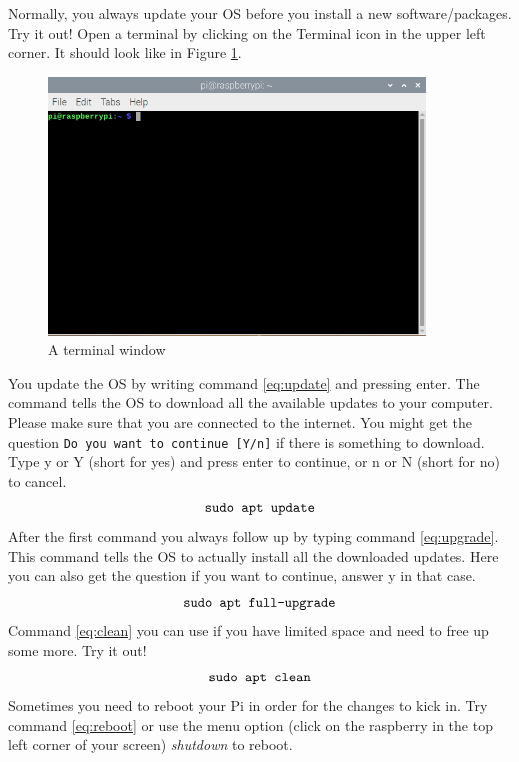 \documentclass{article}
\newcommand{\figref}[1]{Figure \ref{fig:#1}}
\begin{document}
Normally, you always update your OS before you install a new software/packages.\\
Try it out! Open a terminal by clicking on the Terminal icon in the upper left corner. It should look like in \figref{terminal}.
\begin{figure}[h]
    \centering
    \includegraphics[width=100mm]{terminal.png}
    \caption{A terminal window}
    \label{fig:terminal}
\end{figure}
\newline
You update the OS by writing command \eqref{eq:update} and pressing enter. The command tells the OS to download all the available updates to your computer. Please make sure that you are connected to the internet. You might get the question \texttt{Do you want to continue [Y/n]} if there is something to download. Type y or Y (short for yes) and press enter to continue, or n or N (short for no) to cancel.
\begin{equation}
\label{eq:update}
\verb!sudo apt update!
\end{equation}
After the first command you always follow up by typing command \eqref{eq:upgrade}. This command tells the OS to actually install all the downloaded updates. Here you can also get the question if you want to continue, answer y in that case. 
\begin{equation}
\label{eq:upgrade}
\verb!sudo apt full-upgrade!
\end{equation}
Command \eqref{eq:clean} you can use if you have limited space and need to free up some more. Try it out!
\begin{equation}
\label{eq:clean}
\verb!sudo apt clean!
\end{equation}
Sometimes you need to reboot your Pi in order for the changes to kick in. Try command \eqref{eq:reboot} or use the menu option (click on the raspberry in the top left corner of your screen) \emph{shutdown} to reboot.
\end{document}
